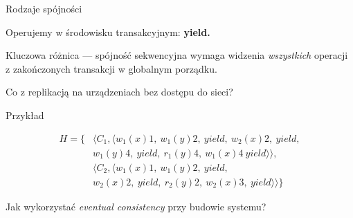 \documentclass{beamer}
\begin{document}
\begin{frame}{Rodzaje spójności}
	\begin{card}
		Operujemy w środowisku transakcyjnym: \onslide<2-> { \textbf{yield.} }
	\end{card}
		
	 {
		\begin{card}
			Kluczowa różnica --- spójność sekwencyjna wymaga widzenia \emph{wszystkich} operacji z zakończonych transakcji w globalnym porządku.
			
			\onslide<4-> {
				Co z replikacją na urządzeniach bez dostępu do sieci?
			}
		\end{card}
	}
\end{frame}

\begin{frame}{Przykład}
	\begin{card}
		\begin{equation*}
			\begin{split}
				H = \{ &\langle C_1, \langle w_1(x)1,\ w_1(y)2,\ yield,\ w_2(x)2,\ yield, \\ 
&w_1(y)4,\ yield,\ r_1(y)4,\ w_1(x)4\ yield \rangle \rangle, \\ 
&\langle C_2, \langle w_1(x)1,\ w_1(y)2,\ yield, \\
&w_2(x)2,\ yield,\ r_2(y)2,\ w_2(x)3,\ yield \rangle \rangle \} 
			\end{split}
		\end{equation*}
	\end{card}
	 {
		\begin{card}
			Jak wykorzystać \emph{eventual consistency} przy budowie systemu?
		\end{card}
	}
\end{frame}
\end{document}
